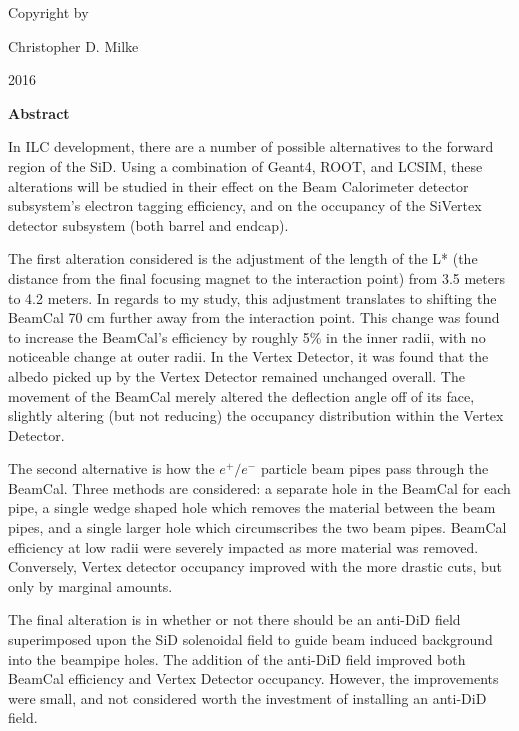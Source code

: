 \documentclass{report}
\begin{document}
    \newpage \begin{center} 
        \vspace*{\fill}
        Copyright \textcopyright by

        Christopher D. Milke 

        2016
        \vspace*{\fill}
    \end{center} \newpage


        \begin{center} \LARGE \textbf{Abstract} \end{center}

        In ILC development, there are a number of possible alternatives to the forward region of the SiD. Using a combination of Geant4, ROOT, and LCSIM, these alterations will be studied in their effect on the Beam Calorimeter detector subsystem's electron tagging efficiency, and on the occupancy of the SiVertex detector subsystem (both barrel and endcap).

        The first alteration considered is the adjustment of the length of the L* (the distance from the final focusing magnet to the interaction point) from 3.5 meters to 4.2 meters. In regards to my study, this adjustment translates to shifting the BeamCal 70 cm further away from the interaction point. This change was found to increase the BeamCal's efficiency by roughly 5\% in the inner radii, with no noticeable change at outer radii. In the Vertex Detector, it was found that the albedo picked up by the Vertex Detector remained unchanged overall. The movement of the BeamCal merely altered the deflection angle off of its face, slightly altering (but not reducing) the occupancy distribution within the Vertex Detector.

        The second alternative is how the $e^+/e^-$ particle beam pipes pass through the BeamCal. Three methods are considered: a separate hole in the BeamCal for each pipe, a single wedge shaped hole which removes the material between the beam pipes, and a single larger hole which circumscribes the two beam pipes. BeamCal efficiency at low radii were severely impacted as more material was removed. Conversely, Vertex detector occupancy improved with the more drastic cuts, but only by marginal amounts.

        The final alteration is in whether or not there should be an anti-DiD field superimposed upon the SiD solenoidal field to guide beam induced background into the beampipe holes. The addition of the anti-DiD field improved both BeamCal efficiency and Vertex Detector occupancy. However, the improvements were small, and not considered worth the investment of installing an anti-DiD field.
    \newpage
\end{document}
